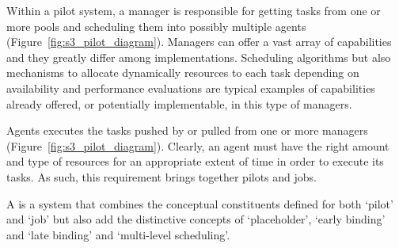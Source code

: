 \documentclass{sig-alternate}
\begin{document}



Within a pilot system, a manager is responsible for getting tasks from
one or more pools and scheduling them into possibly multiple agents
(Figure~\ref{fig:s3_pilot_diagram}). Managers can offer a vast array
of capabilities and they greatly differ among \pilotjob
implementations. Scheduling algorithms but also mechanisms to allocate
dynamically resources to each task depending on availability and
performance evaluations are typical examples of capabilities already
offered, or potentially implementable, in this type of managers.


Agents executes the tasks pushed by or pulled from one or more managers (Figure~\ref{fig:s3_pilot_diagram}). Clearly, an agent must have the right amount and type of resources for an appropriate extent of time in order to execute its tasks. As such, this requirement brings together pilots and jobs.


A \pilotjob is a system that combines the conceptual constituents
defined for both `pilot' and `job' but also add the distinctive
concepts of `placeholder', `early binding' and `late binding' and
`multi-level scheduling'. 

\end{document}
